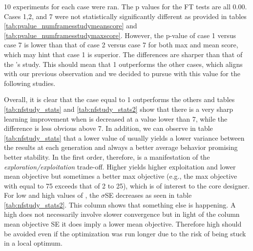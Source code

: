 10 experiments for each case were ran. The p values for the FT tests are all 0.00. Cases 1,2, and 7 were not statistically significantly different  as provided in tables \ref{tab:pvalue_numframesstudymeanscore} and \ref{tab:pvalue_numframesstudymaxscore}. However, the p-value of case 1 versus case 7 is lower than that of case 2 versus case 7 for both max and mean score, which may hint that case 1 is superior. The differences are sharper than that of the 's study. This should mean that 1 outperforms the other cases, which aligns with our previous observation and we decided to pursue with this value for the following studies.

Overall, it is clear that the case  equal to 1 outperforms the others and tables \ref{tab:nfstudy_stats} and \ref{tab:nfstudy_stats2} show that there is a very sharp learning improvement when  is decreased at a value lower than 7, while the difference is less obvious above 7.  In addition, we can observe in table \ref{tab:nfstudy_stats} that a lower value of  usually yields a lower variance between the results at each generation and always a better average behavior promising better stability.  In the first order, therefore,  is a manifestation of the \textit{exploration/exploitation} trade-off. Higher  yields higher exploitation and lower mean objective but sometimes a better max objective (e.g., the max objective with  equal to 75 exceeds that of 2 to 25), which is of interest to the core designer. For low and high values of , the $\sigma$SE decreases as seen in table \ref{tab:nfstudy_stats2}. This column shows that something else is happening. A high  does not necessarily involve slower convergence but in light of the column mean objective SE it does imply a lower mean objective. Therefore high  should be avoided even if the optimization was run longer due to the risk of being stuck in a local optimum. 

